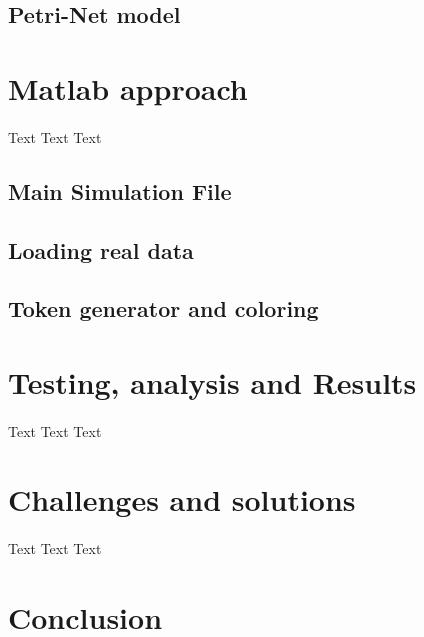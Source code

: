 \documentclass[a4paper]{article}
\begin{document}
\subsection{Petri-Net model}

%
\section{Matlab approach}

\paragraph{}
Text Text Text

\subsection{Main Simulation File}
\subsection{Loading real data}
\subsection{Token generator and coloring}

%                                      
\section{Testing, analysis and Results}   

\paragraph{}
Text Text Text

%
\section{Challenges and solutions}    

\paragraph{}
Text Text Text

%
\section{Conclusion}
\end{document}
